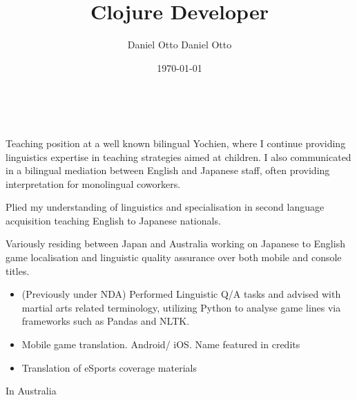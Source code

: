 \documentclass[10pt,a4paper,ragged2e,withhyper]{altacv}
\author{Daniel Otto Daniel Otto}
\date{\today}
\title{Clojure Developer}
\begin{document}

\makecvheader

​\begin{paracol}{2}

\label{sec:orgf115291}
Teaching position at a well known bilingual Yochien, where I continue providing linguistics expertise in teaching strategies aimed at children. I also communicated in a bilingual mediation between English and Japanese staff, often providing interpretation for monolingual coworkers.
\par\divider
{}
Plied my understanding of linguistics and specialisation in second language acquisition teaching English to Japanese nationals.
\par\divider
{}
Variously residing between Japan and Australia working on Japanese to English game localisation and linguistic quality assurance over both mobile and console titles.

\label{sec:org8cd86ec}
\begin{itemize}
\item (Previously under NDA) Performed Linguistic Q/A tasks and advised with martial arts related terminology, utilizing Python to analyse game lines via frameworks such as Pandas and NLTK.
\end{itemize}
\begin{itemize}
\item Mobile game translation. Android/ iOS. Name featured in credits
\end{itemize}
\begin{itemize}
\item Translation of eSports coverage materials
\end{itemize}
\label{sec:orga233655}
In Australia
\switchcolumn


\end{paracol}
\end{document}
